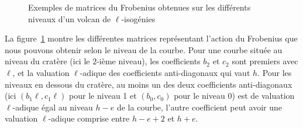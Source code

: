 \documentclass[10pt,a4paper]{book}
\theoremstyle{plain}
\theoremstyle{definition}
\theoremstyle{definition}
\theoremstyle{definition}
\theoremstyle{definition}
\theoremstyle{definition}
\theoremstyle{remark}
\theoremstyle{remark}
\theoremstyle{definition}
\begin{document}
\begin{figure}
\begin{center}
\end{center}
\caption{\label{fig:atk:dif:niv:mat} Exemples de matrices du Frobenius obtenues sur les différents niveaux d'un volcan de $\ell$-isogénies}
\end{figure}
La figure~\ref{fig:atk:dif:niv:mat} montre les différentes matrices
représentant l'action du Frobenius que nous pouvons obtenir selon le niveau de 
la courbe. Pour une courbe située au niveau %
du cratère (ici le $2$-ième niveau), les coefficients $b_2$ et $c_2$ sont
premiers avec $\ell$, et la valuation $\ell$-adique des coefficients 
anti-diagonaux qui vaut $h$. Pour les niveaux en dessous du cratère, au 
moins un des deux coefficients anti-diagonaux (ici $(b_1\ell,c_1\ell)$ pour le 
niveau 1 et $(b_0,c_0)$ pour le niveau $0$) est de valuation $\ell$-adique 
égal au niveau $h-e$ de la courbe, l'autre coefficient peut avoir une valuation 
$\ell$-adique comprise entre $h-e+2$ et $h+e$.
\end{document}
